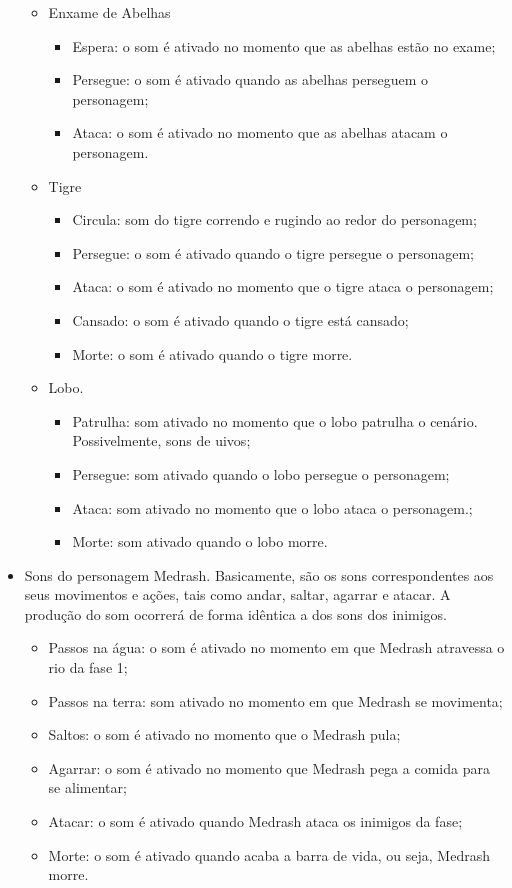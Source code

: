 \begin{itemize}
\begin{itemize}
\item Enxame de Abelhas
\begin{itemize}
\item Espera: o som é ativado no momento que as abelhas estão 
no exame;
\item Persegue: o som é ativado quando as abelhas perseguem o personagem;
\item Ataca: o som é ativado no momento que as abelhas atacam o personagem.
\end{itemize}

\item Tigre
\begin{itemize}
\item Circula: som do tigre correndo e rugindo ao redor do personagem;
\item Persegue: o som é ativado quando o tigre persegue o personagem;
\item Ataca: o som é ativado no momento que o tigre ataca o personagem;
\item Cansado: o som é ativado quando o tigre está cansado;
\item Morte: o som é ativado quando o tigre morre.
\end{itemize}

\item Lobo.
\begin{itemize}
\item Patrulha: som ativado no momento que o lobo patrulha o cenário. Possivelmente, sons de uivos;
\item Persegue: som ativado quando o lobo persegue o personagem;
\item Ataca: som ativado no momento que o lobo ataca o personagem.;
\item Morte: som ativado quando o lobo morre.
\end{itemize}

\end{itemize}

\item Sons do personagem Medrash. Basicamente, são os sons correspondentes
 aos seus movimentos e ações, tais como andar, saltar, agarrar e atacar. A
 produção do som ocorrerá de forma idêntica a dos sons dos inimigos.

\begin{itemize}
\item Passos na água: o som é ativado no momento em que Medrash 
atravessa o rio da fase 1;
\item Passos na terra: som ativado no momento em que Medrash se
 movimenta;
 \item Saltos: o som é ativado no momento que o Medrash pula;
\item Agarrar: o som é ativado no momento que Medrash pega a 
comida para se alimentar;
\item Atacar: o som é ativado quando Medrash ataca os inimigos
 da fase;
\item Morte: o som é ativado quando acaba a barra de vida, ou seja, 
Medrash morre.
\end{itemize}



\end{itemize}
